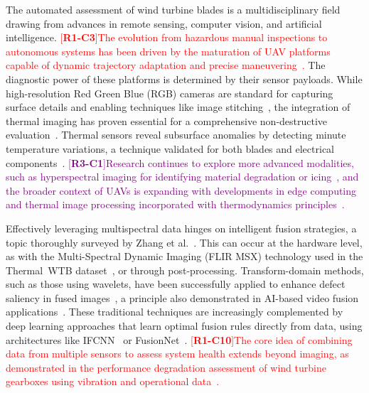 \documentclass[energies,article,submit,pdftex,moreauthors]{Definitions/mdpi}
\newcommand{\revtag}[2]{[\textbf{R#1-C#2}]}
\newcommand{\Rone}[1]{\textcolor{red}{#1}}
\newcommand{\Rthree}[1]{\textcolor{purple}{#1}}
\begin{document}
The automated assessment of wind turbine blades is a multidisciplinary field drawing from advances in remote sensing, computer vision, and artificial intelligence. \Rone{\revtag{1}{3}The evolution from hazardous manual inspections to autonomous systems has been driven by the maturation of UAV platforms capable of dynamic trajectory adaptation and precise maneuvering~\cite{Svystun2025Dytam}.} The diagnostic power of these platforms is determined by their sensor payloads. While high-resolution Red Green Blue (RGB) cameras are standard for capturing surface details and enabling techniques like image stitching~\cite{Yang2023Towards}, the integration of thermal imaging has proven essential for a comprehensive non-destructive evaluation~\cite{Svystun2024Thermal}. Thermal sensors reveal subsurface anomalies by detecting minute temperature variations, a technique validated for both blades and electrical components~\cite{Zhou2023Wind}. \Rthree{\revtag{3}{1}Research continues to explore more advanced modalities, such as hyperspectral imaging for identifying material degradation or icing~\cite{Rizk2024Advanced}, and the broader context of UAVs is expanding with developments in edge computing and thermal image processing incorporated with thermodynamics principles~\cite{Chen2023AQUADA}.}

Effectively leveraging multispectral data hinges on intelligent fusion strategies, a topic thoroughly surveyed by Zhang et al.~\cite{Zhang2021Image}. This can occur at the hardware level, as with the Multi-Spectral Dynamic Imaging (FLIR MSX) technology used in the Thermal~WTB dataset~\cite{Memari2024Data}, or through post-processing. Transform-domain methods, such as those using wavelets, have been successfully applied to enhance defect saliency in fused images~\cite{Zhao2024Enhanced}, a principle also demonstrated in AI-based video fusion applications~\cite{Jia2024AiBased}. These traditional techniques are increasingly complemented by deep learning approaches that learn optimal fusion rules directly from data, using architectures like IFCNN~\cite{Zhang2020Ifcnn} or FusionNet~\cite{Quan2021Fusionnet}. \Rone{\revtag{1}{10}The core idea of combining data from multiple sensors to assess system health extends beyond imaging, as demonstrated in the performance degradation assessment of wind turbine gearboxes using vibration and operational data~\cite{Pan2019Performance}.}
\end{document}
